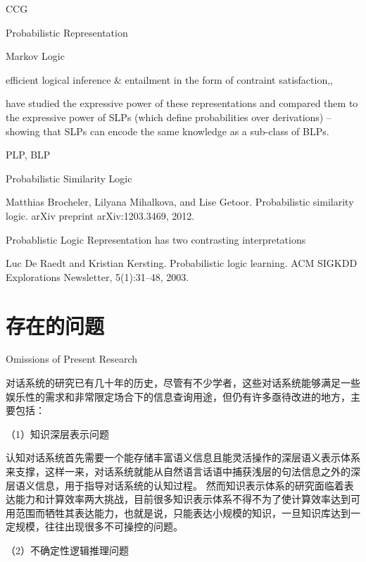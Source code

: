 CCG

Probabilistic Representation \cite{Poon2009}

Markov Logic\cite{Domingos2007}

efficient logical inference \& entailment in the form of contraint satisfaction\cite{Giordani2010a},\cite{Giordani2010b}, \cite{Giordani2009}

\cite{Puech2003}have studied
the expressive power of these representations and compared them to the expressive
power of SLPs (which define probabilities over derivations) – showing
that SLPs can encode the same knowledge as a sub-class of BLPs. 

PLP, BLP\cite{Kersting2007}


Probabilistic Similarity Logic\cite{Brocheler2012}

Matthias Brocheler, Lilyana Mihalkova, and Lise Getoor. Probabilistic similarity
logic. arXiv preprint arXiv:1203.3469, 2012.

Probablistic Logic Representation has two contrasting interpretations\cite{DaRaett2003}

Luc De Raedt and Kristian Kersting. Probabilistic logic learning. ACM
SIGKDD Explorations Newsletter, 5(1):31–48, 2003. 




\section{存在的问题}{Omissions of Present Research}

对话系统的研究已有几十年的历史，尽管有不少学者，这些对话系统能够满足一些娱乐性的需求和非常限定场合下的信息查询用途，但仍有许多亟待改进的地方，主要包括：

（1）知识深层表示问题

        认知对话系统首先需要一个能存储丰富语义信息且能灵活操作的深层语义表示体系来支撑，这样一来，对话系统就能从自然语言话语中捕获浅层的句法信息之外的深层语义信息，用于指导对话系统的认知过程。 然而知识表示体系的研究面临着表达能力和计算效率两大挑战，目前很多知识表示体系不得不为了使计算效率达到可用范围而牺牲其表达能力，也就是说，只能表达小规模的知识，一旦知识库达到一定规模，往往出现很多不可操控的问题。

（2）不确定性逻辑推理问题

